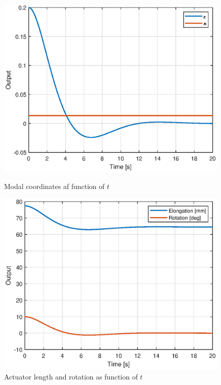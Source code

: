 \begin{figure}[H]
    \centering
    \begin{minipage}{.5\textwidth}
        \centering
        \includegraphics[width = \textwidth]{Figures/ProgresFigures/qp0.eps}
        \caption{Modal coordinates af function of $t$}
        \label{fig:prob1_6_2}
    \end{minipage}%
    \begin{minipage}{0.5\textwidth}
        \centering
        \includegraphics[width = \textwidth]{Figures/ProgresFigures/xp0.eps}
        \caption{Actuator length and rotation as function of $t$}
        \label{fig:prob1_6_1}
    \end{minipage}
\end{figure}


